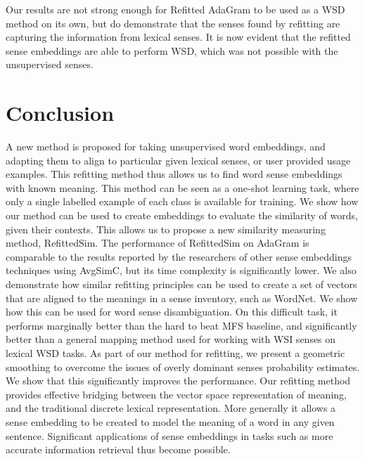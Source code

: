 \documentclass{llncs}
\begin{document}
Our results are not strong enough for Refitted AdaGram to be used as a WSD method on its own, but do demonstrate that the senses found by refitting are capturing the information from lexical senses.
It is now evident that the refitted sense embeddings are able to perform WSD, which was not possible with the unsupervised senses. 

\section{Conclusion}\label{conclusion}

A new method is proposed for taking unsupervised word embeddings, and adapting them to align to particular given lexical senses, or user provided usage examples. 
This refitting method thus allows us to find word sense embeddings with known meaning.
This method can be seen as a one-shot learning task, where only a single labelled example of each class is available for training.
We show how our method can be used to create embeddings to evaluate the similarity of words, given their contexts.
This allows us to propose a new similarity measuring method, RefittedSim.
The performance of RefittedSim on AdaGram is comparable to the results reported by the researchers of other sense embeddings techniques using AvgSimC, but its time complexity is significantly lower.
We also demonstrate how similar refitting principles can be used to create a set of vectors that are aligned to the meanings in a sense inventory, such as WordNet.
We show how this can be used for word sense disambiguation.
On this difficult task, it performs marginally better than the hard to beat MFS baseline, and significantly better than a general mapping method used for working with WSI senses on lexical WSD tasks.
As part of our method for refitting, we present a geometric smoothing to overcome the issues of overly dominant senses probability estimates.
We show that this significantly improves the performance.
Our refitting method provides effective bridging between the vector space representation of meaning, and the traditional discrete lexical representation.
More generally it allows a sense embedding to be created to model the meaning of a word in any given sentence.
Significant applications  of sense embeddings in tasks such as more accurate information retrieval thus become possible.


\clearpage
{}


\end{document}
